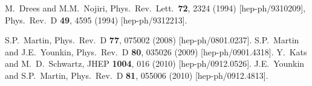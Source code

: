 \documentclass[11pt]{article}
\begin{document}
\begin{thebibliography}{999}




  M.~Drees and M.M.~Nojiri,
  Phys.\ Rev.\ Lett.\  {\bf 72}, 2324 (1994)
  [hep-ph/9310209],
  Phys.\ Rev.\  D {\bf 49}, 4595 (1994)
  [hep-ph/9312213].

  S.P.~Martin,
  Phys.\ Rev.\  D {\bf 77}, 075002 (2008)
  [hep-ph/0801.0237].
S.P.~Martin and J.E.~Younkin,
  Phys.\ Rev.\  D {\bf 80}, 035026 (2009)
  [hep-ph/0901.4318].
Y.~Kats and M.~D.~Schwartz,
  JHEP {\bf 1004}, 016 (2010)
  [hep-ph/0912.0526].
J.E.~Younkin and S.P.~Martin,
  Phys.\ Rev.\  D {\bf 81}, 055006 (2010)
  [hep-ph/0912.4813].




\end{thebibliography}
\end{document}
